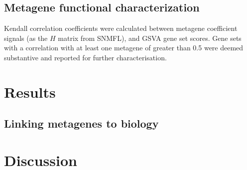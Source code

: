 \documentclass[thesis.tex]{subfiles}
\begin{document}
\subsection{Metagene functional characterization}
Kendall correlation coefficients were calculated between metagene coefficient signals (as the $H$ matrix from \gls{SNMFL}), and \gls{GSVA} gene set scores.  Gene sets with a correlation with at least one metagene of greater than 0.5 were deemed substantive and reported for further characterisation.

\section{Results}
\subsection{}
\subsection{Linking metagenes to biology}

\section{Discussion}

%
%
\end{document}
